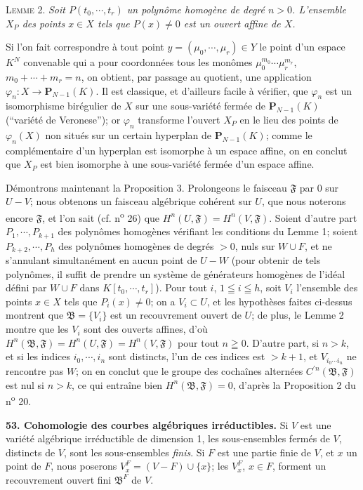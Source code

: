 \textsc{Lemme} 2. \textit{Soit $P(t_0, \cdots, t_r)$ un polynôme homogène de degré $n > 0$. L'ensemble $X_P$ des points $x \in X$ tels que $P(x) \neq 0$ est un ouvert affine de $X$.}

Si l'on fait correspondre à tout point $y = (\mu_0, \cdots, \mu_r) \in Y$ le point d'un espace $K^N$ convenable qui a pour coordonnées tous les monômes $\mu_0^{m_0} \cdots \mu_r^{m_r}$, $m_0 + \cdots + m_r = n$, on obtient, par passage au quotient, une application $\varphi_n : X \to \mathbf{P}_{N-1}(K)$. Il est classique, et d'ailleurs facile à vérifier, que $\varphi_n$ est un isomorphisme birégulier de $X$ sur une sous-variété fermée de $\mathbf{P}_{N-1}(K)$ (``variété de Veronese''); or $\varphi_n$ transforme l'ouvert $X_P$ en le lieu des points de $\varphi_n(X)$ non situés sur un certain hyperplan de $\mathbf{P}_{N-1}(K)$; comme le complémentaire d'un hyperplan est isomorphe à un espace affine, on en conclut que $X_P$ est bien isomorphe à une sous-variété fermée d'un espace affine.

Démontrons maintenant la Proposition 3. Prolongeons le faisceau $\mathfrak{F}$ par 0 sur $U - V$; nous obtenons un faisceau algébrique cohérent sur $U$, que nous noterons encore $\mathfrak{F}$, et l'on sait (cf. n\textsuperscript{o} 26) que $H^n(U, \mathfrak{F}) = H^n(V, \mathfrak{F})$. Soient d'autre part $P_1, \cdots, P_{k+1}$ des polynômes homogènes vérifiant les conditions du Lemme 1; soient $P_{k+2}, \cdots, P_h$ des polynômes homogènes de degrés $> 0$, nuls sur $W \cup F$, et ne s'annulant simultanément en aucun point de $U - W$ (pour obtenir de tels polynômes, il suffit de prendre un système de générateurs homogènes de l'idéal défini par $W \cup F$ dans $K[t_0, \cdots, t_r]$). Pour tout $i$, $1 \leqq i \leqq h$, soit $V_i$ l'ensemble des points $x \in X$ tels que $P_i(x) \neq 0$; on a $V_i \subset U$, et les hypothèses faites ci-dessus montrent que $\mathfrak{B} = \{V_i\}$ est un recouvrement ouvert de $U$; de plus, le Lemme 2 montre que les $V_i$ sont des ouverts affines, d'où $H^n(\mathfrak{B}, \mathfrak{F}) = H^n(U, \mathfrak{F}) = H^n(V, \mathfrak{F})$ pour tout $n \geqq 0$. D'autre part, si $n > k$, et si les indices $i_0, \cdots, i_n$ sont distincts, l'un de ces indices est $> k + 1$, et $V_{i_0 \cdots i_n}$ ne rencontre pas $W$; on en conclut que le groupe des cochaînes alternées $C^{\prime n}(\mathfrak{B}, \mathfrak{F})$ est nul si $n > k$, ce qui entraîne bien $H^n(\mathfrak{B}, \mathfrak{F}) = 0$, d'après la Proposition 2 du n\textsuperscript{o} 20.

\textbf{53. Cohomologie des courbes algébriques irréductibles.} Si $V$ est une variété algébrique irréductible de dimension 1, les sous-ensembles fermés de $V$, distincts de $V$, sont les sous-ensembles \textit{finis}. Si $F$ est une partie finie de $V$, et $x$ un point de $F$, nous poserons $V_x^F = (V - F) \cup \{x\}$; les $V_x^F$, $x \in F$, forment un recouvrement ouvert fini $\mathfrak{B}^F$ de $V$.

